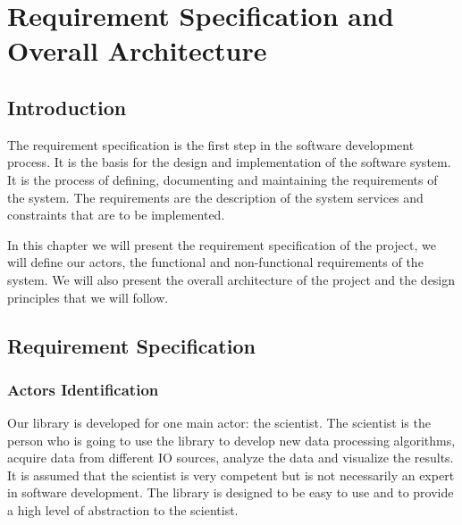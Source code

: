 
\setcounter{chapter}{1}
\chapter{Requirement Specification and Overall Architecture}
\minitoc %
\graphicspath{{Chapitre2/figures/}}


\pagestyle{fancy}
\fancyhf{}
\fancyhead[R]{\bfseries\rightmark}
\fancyfoot[R]{\thepage}
\renewcommand{\headrulewidth}{0.5pt}
\renewcommand{\footrulewidth}{0pt}
\renewcommand{\chaptermark}[1]{\markboth{\MakeUppercase{\chaptername~\thechapter. #1 }}{}}
\renewcommand{\sectionmark}[1]{\markright{\thechapter.\thesection~ #1}}

\begin{spacing}{1.2}
    \section*{Introduction}
    The requirement specification is the first step in the software development process.
    It is the basis for the design and implementation of the software system.
    It is the process of defining, documenting and maintaining the requirements of the system.
    The requirements are the description of the system services and constraints that are to be implemented.

    In this chapter we will present the requirement specification of the project, we will define our actors,
    the functional and non-functional requirements of the system.
    We will also present the overall architecture of the project and the design principles that we will follow.

    \section{Requirement Specification}

    \subsection{Actors Identification}
    Our library is developed for one main actor: the scientist.
    The scientist is the person who is going to use the library to develop new data processing algorithms,
    acquire data from different IO sources, analyze the data and visualize the results.
    It is assumed that the scientist is very competent but is not necessarily an expert in software development.
    The library is designed to be easy to use and to provide a high level of abstraction to the scientist.




\end{spacing}
